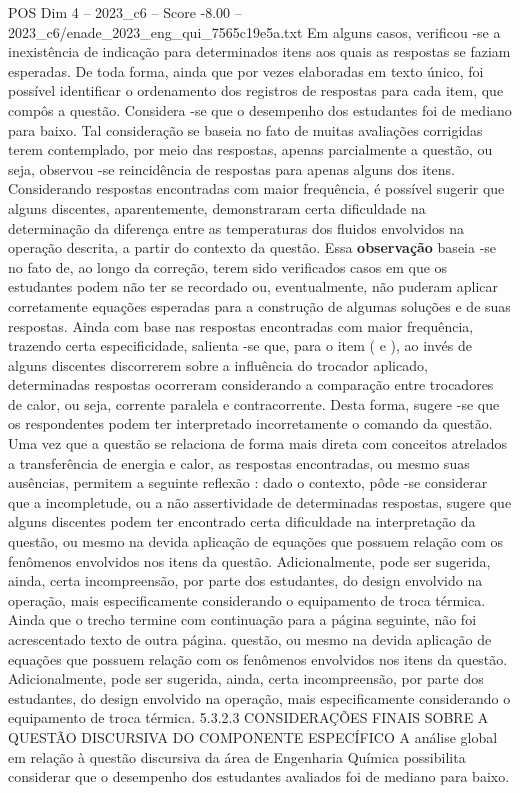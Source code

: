 \begin{textsample}{POS Dim 4 – 2023\_c6 – Score -8.00 – 2023\_c6/enade\_2023\_eng\_qui\_7565c19e5a.txt}
Em alguns casos, verificou -se a inexistência de indicação para determinados itens aos quais as respostas se faziam esperadas.
De toda forma, ainda que por vezes elaboradas em texto único, foi possível identificar o ordenamento dos registros de respostas para cada item, que compôs a questão.
Considera -se que o desempenho dos estudantes foi de mediano para baixo.
Tal consideração se baseia no fato de muitas avaliações corrigidas terem contemplado, por meio das respostas, apenas parcialmente a questão, ou seja, observou -se reincidência de respostas para apenas alguns dos itens.
Considerando respostas encontradas com maior frequência, é possível sugerir que alguns discentes, aparentemente, demonstraram certa dificuldade na determinação da diferença entre as temperaturas dos fluidos envolvidos na operação descrita, a partir do contexto da questão.
Essa \textbf{observação} baseia -se no fato de, ao longo da correção, terem sido verificados casos em que os estudantes podem não ter se recordado ou, eventualmente, não puderam aplicar corretamente equações esperadas para a construção de algumas soluções e de suas respostas.
Ainda com base nas respostas encontradas com maior frequência, trazendo certa especificidade, salienta -se que, para o item ( e ), ao invés de alguns discentes discorrerem sobre a influência do trocador aplicado, determinadas respostas ocorreram considerando a comparação entre trocadores de calor, ou seja, corrente paralela e contracorrente.
Desta forma, sugere -se que os respondentes podem ter interpretado incorretamente o comando da questão.
Uma vez que a questão se relaciona de forma mais direta com conceitos atrelados a transferência de energia e calor, as respostas encontradas, ou mesmo suas ausências, permitem a seguinte reflexão : dado o contexto, pôde -se considerar que a incompletude, ou a não assertividade de determinadas respostas, sugere que alguns discentes podem ter encontrado certa dificuldade na interpretação da questão, ou mesmo na devida aplicação de equações que possuem relação com os fenômenos envolvidos nos itens da questão.
Adicionalmente, pode ser sugerida, ainda, certa incompreensão, por parte dos estudantes, do design envolvido na operação, mais especificamente considerando o equipamento de troca térmica.
Ainda que o trecho termine com continuação para a página seguinte, não foi acrescentado texto de outra página. questão, ou mesmo na devida aplicação de equações que possuem relação com os fenômenos envolvidos nos itens da questão.
Adicionalmente, pode ser sugerida, ainda, certa incompreensão, por parte dos estudantes, do design envolvido na operação, mais especificamente considerando o equipamento de troca térmica. 5.3.2.3 CONSIDERAÇÕES FINAIS SOBRE A QUESTÃO DISCURSIVA DO COMPONENTE ESPECÍFICO A análise global em relação à questão discursiva da área de Engenharia Química possibilita considerar que o desempenho dos estudantes avaliados foi de mediano para baixo.

\end{textsample}

